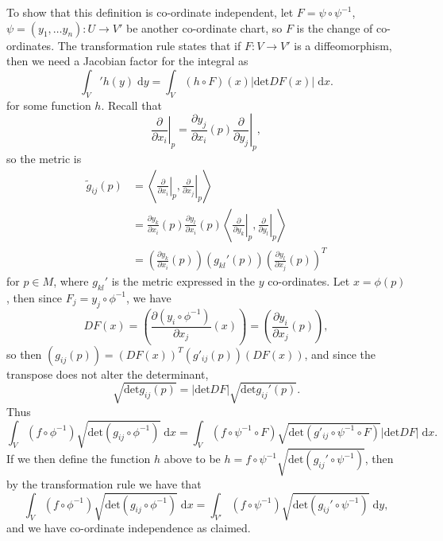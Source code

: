 \documentclass[letter-paper]{tufte-book}
\begin{document}
To show that this definition is co-ordinate independent, let $F = \psi \circ \psi^{-1}$, $\psi = (y_1, \ldots y_n) : U \to V'$ be another co-ordinate chart, so $F$ is the change of co-ordinates. The transformation rule states that if $F: V \to V'$ is a diffeomorphism, then we need a Jacobian factor for the integral as
\begin{equation}
  \int_V' h(y)\; \mathrm{d}y = \int_V (h\circ F)(x) |\mbox{det}DF(x)|\; \mathrm{d}x.
\end{equation}
for some function $h$. Recall that
\begin{equation*}
  \left.\frac{\partial}{\partial x_i}\right|_p = \frac{\partial y_j}{\partial x_i}(p)\left.\frac{\partial}{\partial y_j}\right|_p,
\end{equation*}
so the metric is
\begin{align*}
  \tilde{g}_{ij}(p) 
    &= \left\langle \left.\frac{\partial}{\partial x_i}\right|_p, \left.\frac{\partial}{\partial x_j}\right|_p\right\rangle\\
    &=\frac{\partial y_k}{\partial x_i}(p) \frac{\partial y_l}{\partial x_i}(p) \left\langle \left.\frac{\partial}{\partial y_k}\right|_p, \left.\frac{\partial}{\partial y_l}\right|_p\right\rangle\\
    &=\left(\frac{\partial y_k}{\partial x_i}(p)\right)(g_{kl}'(p)) \left(\frac{\partial y_l}{\partial x_j}(p)\right)^T
\end{align*}
for $p\in M$, where $g_{kl}'$ is the metric expressed in the $y$ co-ordinates. Let $x = \phi(p)$, then since $F_j = y_j \circ \phi^{-1}$, we have
\begin{equation*}
  DF(x) = \left(\frac{\partial (y_i \circ \phi^{-1})}{\partial x_j}(x)\right) = \left(\frac{\partial y_i}{\partial x_j}(p)\right),
\end{equation*}
so then $(g_{ij}(p)) = (DF(x))^T (g'_{ij}(p)) (DF(x))$, and since the transpose does not alter the determinant,
\begin{equation*}
  \sqrt{\mbox{det}g_{ij}(p)} = |\mbox{det}DF| \sqrt{\mbox{det}g_{ij}'(p)}.
\end{equation*}
Thus
\begin{equation*}
  \int_V (f\circ \phi^{-1})\sqrt{\mbox{det}(g_{ij} \circ \phi^{-1})}\; \mathrm{d}x = \int_V (f\circ \psi^{-1} \circ F)\sqrt{\mbox{det}(g'_{ij} \circ \psi^{-1} \circ F)} |\mbox{det}DF|\; \mathrm{d}x.
\end{equation*}
If we then define the function $h$ above to be $h = f \circ \psi^{-1}\sqrt{\mbox{det}(g_{ij}'\circ \psi^{-1})}$, then by the transformation rule we have that
\begin{equation*}
  \int_V (f\circ \phi^{-1})\sqrt{\mbox{det}(g_{ij} \circ \phi^{-1})}\; \mathrm{d}x = \int_{V'} (f\circ \psi^{-1})\sqrt{\mbox{det}(g_{ij}' \circ \psi^{-1})}\; \mathrm{d}y,
\end{equation*}
and we have co-ordinate independence as claimed.
\end{document}
